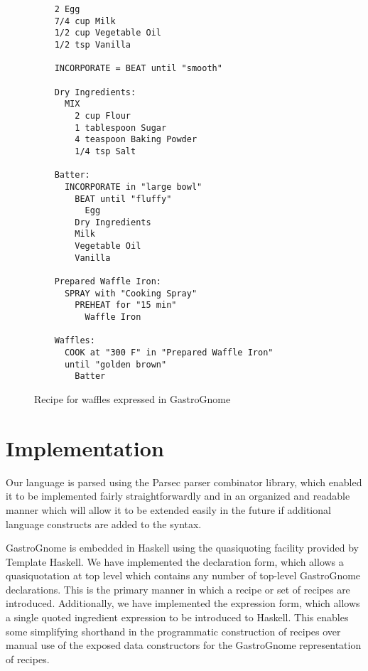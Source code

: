\documentclass[pldi]{sigplanconf-pldi15}
\begin{document}
\begin{figure}
	\begin{verbatim}
	2 Egg
	7/4 cup Milk
	1/2 cup Vegetable Oil
	1/2 tsp Vanilla

	INCORPORATE = BEAT until "smooth"

	Dry Ingredients:
	  MIX
	    2 cup Flour
	    1 tablespoon Sugar
	    4 teaspoon Baking Powder
	    1/4 tsp Salt
 
	Batter:
	  INCORPORATE in "large bowl" 
	    BEAT until "fluffy"
	      Egg
	    Dry Ingredients
	    Milk
	    Vegetable Oil
	    Vanilla

	Prepared Waffle Iron:
	  SPRAY with "Cooking Spray"
	    PREHEAT for "15 min"
	      Waffle Iron
 
	Waffles:
	  COOK at "300 F" in "Prepared Waffle Iron"
	  until "golden brown"
	    Batter	
	\end{verbatim}
	\caption{Recipe for waffles expressed in GastroGnome}
	\label{fig:waffles}
\end{figure}

\section{Implementation}
Our language is parsed using the Parsec parser combinator library, which
enabled it to be implemented fairly straightforwardly and in an organized and
readable manner which will allow it to be extended easily in the future if
additional language constructs are added to the syntax.

GastroGnome is embedded in Haskell using the quasiquoting facility provided by
Template Haskell. We have implemented the declaration form, which allows a
quasiquotation at top level which contains any number of top-level GastroGnome
declarations. This is the primary manner in which a recipe or set of recipes
are introduced. Additionally, we have implemented the expression form, which
allows a single quoted ingredient expression to be introduced to Haskell. This
enables some simplifying shorthand in the programmatic construction of recipes
over manual use of the exposed data constructors for the GastroGnome
representation of recipes.
\end{document}
